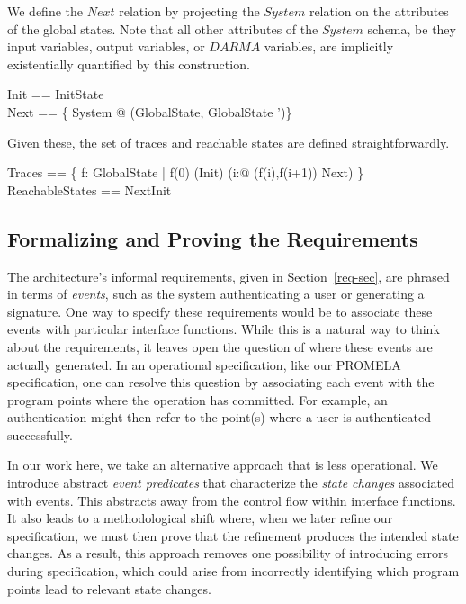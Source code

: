\documentclass[a4paper,pdftex]{article}
\begin{document}
We define the $Next$ relation by projecting the $System$ relation on the
attributes of the global states.  Note that all other attributes of the
$System$ schema, be they input variables, output variables, or $DARMA$
variables, are implicitly existentially quantified by this construction.

\begin{zed}
Init            == InitState \\
Next            == \{ System @ (\theta GlobalState, \theta GlobalState ')\} \\
\end{zed}

Given these, the set of traces and reachable states are defined
straightforwardly.
\begin{zed}
Traces          == \{ f: \nat \fun GlobalState | f(0) \in (Init) \land (\forall i:\nat @ (f(i),f(i+1)) \in Next) \} \\
ReachableStates == Next\star \limg Init \rimg 
\end{zed}


\subsection{Formalizing and Proving the Requirements} \label{req-proofs}

The architecture's informal requirements, given in
Section~\ref{req-sec}, are phrased in terms of \emph{events}, such as the
system authenticating a user or generating a signature.  One way to
specify these requirements would be to associate these events with
particular interface functions.   While this is a natural way to 
think about the requirements, it leaves open the question of where
these events are actually generated.   In an 
operational specification, like our PROMELA specification, one 
can resolve this question by associating each event
with the program points where the operation has committed.
For example, an authentication might then refer to the point(s) where
a user is authenticated successfully.   

In our work here, we take an alternative approach that is less operational.
We introduce abstract \emph{event predicates} that characterize the 
\emph{state changes} associated with events.   This 
abstracts away from the control flow within
interface functions.   It also leads to a methodological shift where,
when we later refine our specification, we must then prove that the
refinement produces the intended state changes.  As a result,
this approach removes one possibility of introducing
errors during specification, which could arise from incorrectly
identifying which program points lead to relevant state changes.
\end{document}
